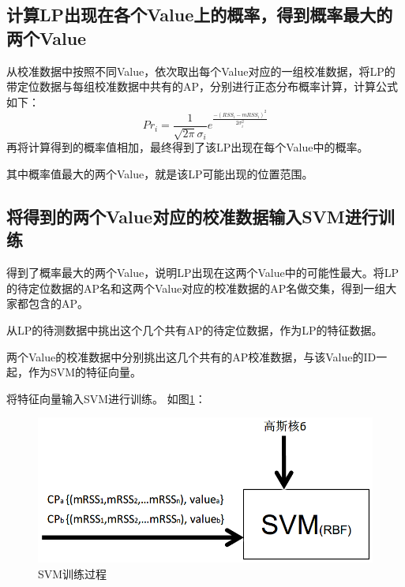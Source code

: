 \documentclass[a4paper, UTF8, twocolumn ]{ctexart}
\begin{document}
\subsection{计算LP出现在各个Value上的概率，得到概率最大的两个Value}
从校准数据中按照不同Value，依次取出每个Value对应的一组校准数据，将LP的带定位数据与每组校准数据中共有的AP，分别进行正态分布概率计算，计算公式如下：
\begin{equation}
  Pr_{i}=\frac{1}{\sqrt{2\pi}\sigma_{i}}e^{\frac{-(RSS_{i}-mRSS_{i})^{2}}{2\sigma_{i}^{2}}}
\end{equation}
再将计算得到的概率值相加，最终得到了该LP出现在每个Value中的概率。
\par
其中概率值最大的两个Value，就是该LP可能出现的位置范围。

\subsection{将得到的两个Value对应的校准数据输入SVM进行训练}
得到了概率最大的两个Value，说明LP出现在这两个Value中的可能性最大。将LP的待定位数据的AP名和这两个Value对应的校准数据的AP名做交集，得到一组大家都包含的AP。
\par
从LP的待测数据中挑出这个几个共有AP的待定位数据，作为LP的特征数据。
\par
两个Value的校准数据中分别挑出这几个共有的AP校准数据，与该Value的ID一起，作为SVM的特征向量。
\par
将特征向量输入SVM进行训练。 如图\ref{fig:no9}：
\begin{figure}[!ht]\centering
  \includegraphics[keepaspectratio, scale=0.3]{no9.png}
  \caption{SVM训练过程\label{fig:no9}} 
\end{figure}
\end{document}
